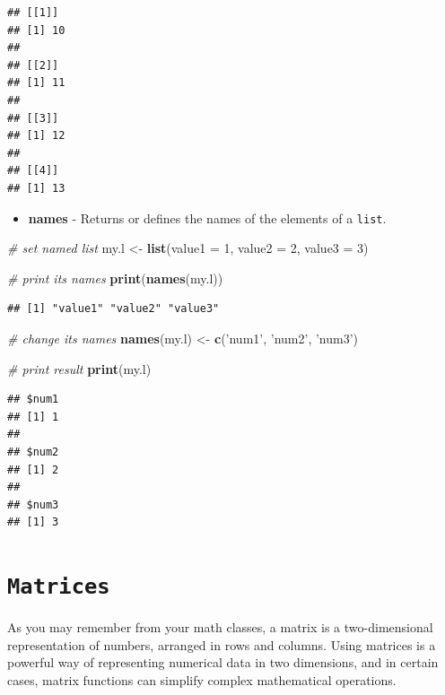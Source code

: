 \documentclass[11pt,]{book}
\newenvironment{Shaded}{\begin{snugshade}}{\end{snugshade}}
\newcommand{\KeywordTok}[1]{\textcolor[rgb]{0.27,0.27,0.27}{\textbf{#1}}}
\newcommand{\DataTypeTok}[1]{\textcolor[rgb]{0.27,0.27,0.27}{#1}}
\newcommand{\DecValTok}[1]{\textcolor[rgb]{0.06,0.06,0.06}{#1}}
\newcommand{\StringTok}[1]{\textcolor[rgb]{0.5,0.5,0.5}{#1}}
\newcommand{\CommentTok}[1]{\textcolor[rgb]{0.56,0.35,0.01}{\textit{#1}}}
\newcommand{\NormalTok}[1]{#1}
\providecommand{\tightlist}{%
  \setlength{\itemsep}{0pt}\setlength{\parskip}{0pt}}
\begin{document}
\begin{verbatim}
## [[1]]
## [1] 10
## 
## [[2]]
## [1] 11
## 
## [[3]]
## [1] 12
## 
## [[4]]
## [1] 13
\end{verbatim}

\begin{itemize}
\tightlist
\item
  \textbf{names} - Returns or defines the names of the elements of a
  \texttt{list}. 
\end{itemize}

\begin{Shaded}
\begin{Highlighting}[]
\CommentTok{# set named list}
\NormalTok{my.l <-}\StringTok{ }\KeywordTok{list}\NormalTok{(}\DataTypeTok{value1 =} \DecValTok{1}\NormalTok{, }\DataTypeTok{value2 =} \DecValTok{2}\NormalTok{, }\DataTypeTok{value3 =} \DecValTok{3}\NormalTok{)}

\CommentTok{# print its names}
\KeywordTok{print}\NormalTok{(}\KeywordTok{names}\NormalTok{(my.l))}
\end{Highlighting}
\end{Shaded}

\begin{verbatim}
## [1] "value1" "value2" "value3"
\end{verbatim}

\begin{Shaded}
\begin{Highlighting}[]
\CommentTok{# change its names}
\KeywordTok{names}\NormalTok{(my.l) <-}\StringTok{ }\KeywordTok{c}\NormalTok{(}\StringTok{'num1'}\NormalTok{, }\StringTok{'num2'}\NormalTok{, }\StringTok{'num3'}\NormalTok{)}

\CommentTok{# print result}
\KeywordTok{print}\NormalTok{(my.l)}
\end{Highlighting}
\end{Shaded}

\begin{verbatim}
## $num1
## [1] 1
## 
## $num2
## [1] 2
## 
## $num3
## [1] 3
\end{verbatim}

\section{\texorpdfstring{\texttt{Matrices}}{Matrices}}\label{matrices}

As you may remember from your math classes, a matrix is a
two-dimensional representation of numbers, arranged in rows and columns.
Using matrices is a powerful way of representing numerical data in two
dimensions, and in certain cases, matrix functions can simplify complex
mathematical operations.  
\end{document}
